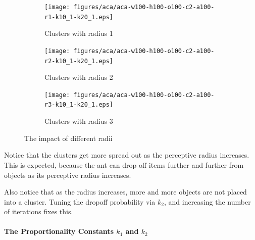 \documentclass[12pt]{article}
\begin{document}
\begin{figure}[H]
    \begin{subfigure}[b]{0.32\textwidth}
        \centering
        \texttt{[image: figures/aca/aca-w100-h100-o100-c2-a100-r1-k10\_1-k20\_1.eps]}
        \caption{Clusters with radius 1}\label{fig:aca:radius-1}
    \end{subfigure}
    \begin{subfigure}[b]{0.32\textwidth}
        \centering
        \texttt{[image: figures/aca/aca-w100-h100-o100-c2-a100-r2-k10\_1-k20\_1.eps]}
        \caption{Clusters with radius 2}\label{fig:aca:radius-2}
    \end{subfigure}
    \begin{subfigure}[b]{0.32\textwidth}
        \centering
        \texttt{[image: figures/aca/aca-w100-h100-o100-c2-a100-r3-k10\_1-k20\_1.eps]}
        \caption{Clusters with radius 3}\label{fig:aca:radius-3}
    \end{subfigure}
    \caption{The impact of different radii}\label{fig:aca:radius}
\end{figure}

Notice that the clusters get more spread out as the perceptive radius increases.
This is expected, because the ant can drop off items further and further from objects as its perceptive radius increases.

Also notice that as the radius increases, more and more objects are not placed into a cluster. Tuning the dropoff probability via $k_2$, and increasing the number of iterations fixes this.

\paragraph{The Proportionality Constants $k_1$ and $k_2$}
\end{document}
